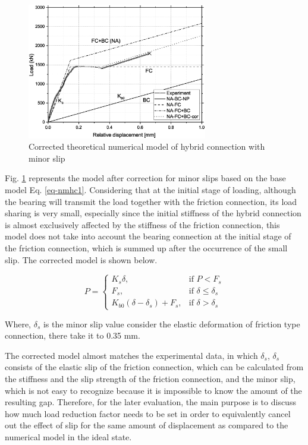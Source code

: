 \begin{figure}[htbp]
    \centering
    \includegraphics[width=0.7\textwidth]{imgs/ch7/nmfcbc-2.eps}
    \caption{Corrected theoretical numerical model of hybrid connection with minor slip}
    \label{fig-nmfcbc2}
\end{figure}

Fig. \ref{fig-nmfcbc2} represents the model after correction for minor slips based on the base model Eq. \ref{eq-nmhc1}. Considering that at the initial stage of loading, although the bearing will transmit the load together with the friction connection, its load sharing is very small, especially since the initial stiffness of the hybrid connection is almost exclusively affected by the stiffness of the friction connection, this model does not take into account the bearing connection at the initial stage of the friction connection, which is summed up after the occurrence of the small slip. The corrected model is shown below.

\begin{equation}\label{eq-nmhc2}
    P = \begin{cases}
        K_s \delta, & \text{if } P < F_{s} \\
        F_{s}, & \text{if } \delta \leq \delta_{s} \\
        K_{b0} (\delta - \delta_s) + F_{s}, & \text{if } \delta > \delta_{s}
    \end{cases}
\end{equation}

Where, $\delta_s$ is the minor slip value consider the elastic deformation of friction type connection, there take it to 0.35 mm.

The corrected model almost matches the experimental data, in which $\delta_s$, $\delta_s$ consists of the elastic slip of the friction connection, which can be calculated from the stiffness and the slip strength of the friction connection, and the minor slip, which is not easy to recognize because it is impossible to know the amount of the resulting gap. Therefore, for the later evaluation, the main purpose is to discuss how much load reduction factor needs to be set in order to equivalently cancel out the effect of slip for the same amount of displacement as compared to the numerical model in the ideal state.



